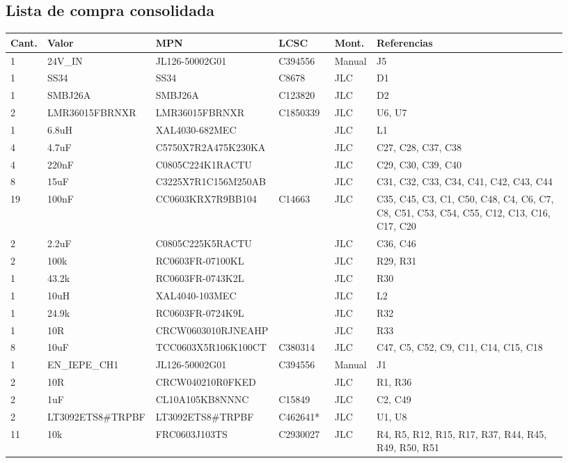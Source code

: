 \documentclass[10pt,a4paper]{article}
\begin{document}
\subsection*{Lista de compra consolidada}
{\scriptsize\begin{longtable}{@{}L{0.05\linewidth}L{0.17\linewidth}L{0.2\linewidth}L{0.1\linewidth}L{0.07\linewidth}L{0.34\linewidth}@{}}\toprule
\textbf{Cant.} & \textbf{Valor} & \textbf{MPN} & \textbf{LCSC} & \textbf{Mont.} & \textbf{Referencias}\\\midrule{} & 24V\_\allowbreak{}IN & JL126-50002G01 & C394556 & Manual & J5\\
1 & SS34 & SS34 & C8678 & JLC & D1\\
1 & SMBJ26A & SMBJ26A & C123820 & JLC & D2\\
2 & LMR36015FBRNXR & LMR36015FBRNXR & C1850339 & JLC & U6, U7\\
1 & 6.8uH & XAL4030-682MEC &  & JLC & L1\\
4 & 4.7uF & C5750X7R2A475K230KA &  & JLC & C27, C28, C37, C38\\
4 & 220nF & C0805C224K1RACTU &  & JLC & C29, C30, C39, C40\\
8 & 15uF & C3225X7R1C156M250AB &  & JLC & C31, C32, C33, C34, C41, C42, C43, C44\\
19 & 100nF & CC0603KRX7R9BB104 & C14663 & JLC & C35, C45, C3, C1, C50, C48, C4, C6, C7, C8, C51, C53, C54, C55, C12, C13, C16, C17, C20\\
2 & 2.2uF & C0805C225K5RACTU &  & JLC & C36, C46\\
2 & 100k & RC0603FR-07100KL &  & JLC & R29, R31\\
1 & 43.2k & RC0603FR-0743K2L &  & JLC & R30\\
1 & 10uH & XAL4040-103MEC &  & JLC & L2\\
1 & 24.9k & RC0603FR-0724K9L &  & JLC & R32\\
1 & 10R & CRCW0603010RJNEAHP &  & JLC & R33\\
8 & 10uF & TCC0603X5R106K100CT & C380314 & JLC & C47, C5, C52, C9, C11, C14, C15, C18\\
1 & EN\_\allowbreak{}IEPE\_\allowbreak{}CH1 & JL126-50002G01 & C394556 & Manual & J1\\
2 & 10R & CRCW040210R0FKED &  & JLC & R1, R36\\
2 & 1uF & CL10A105KB8NNNC & C15849 & JLC & C2, C49\\
2 & LT3092ETS8\#TRPBF & LT3092ETS8\#TRPBF & C462641* & JLC & U1, U8\\
11 & 10k & FRC0603J103TS & C2930027 & JLC & R4, R5, R12, R15, R17, R37, R44, R45, R49, R50, R51\\

\end{longtable}}
\end{document}
